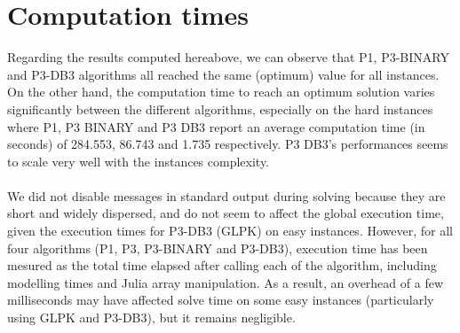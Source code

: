 \section{Computation times}
Regarding the results computed hereabove, we can observe that P1, P3-BINARY and P3-DB3 algorithms all reached the same (optimum) value for all instances. On the other hand, the computation time to reach an optimum solution varies significantly between the different algorithms, especially on the hard instances where P1, P3 BINARY and P3 DB3 report an average computation time (in seconds) of 284.553, 86.743 and 1.735 respectively. P3 DB3's performances seems to scale very well with the instances complexity. \\\\
We did not disable messages in standard output during solving because they are short and widely dispersed, and do not seem to affect the global execution time,
given the execution times for P3-DB3 (GLPK) on easy instances.
However, for all four algorithms (P1, P3, P3-BINARY and P3-DB3), execution time has been mesured as the total time elapsed after calling each of the algorithm,
including modelling times and Julia array manipulation. As a result, an overhead of a few milliseconds may have affected solve time on some easy instances
(particularly using GLPK and P3-DB3), but it remains negligible.

